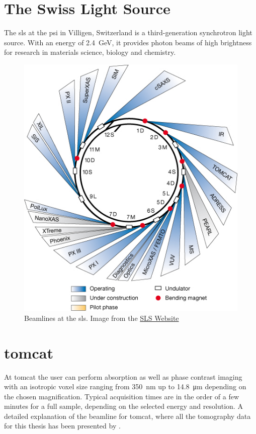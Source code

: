 \section{The Swiss Light Source}
The \ac{sls} at the \ac{psi} in Villigen, Switzerland is a third-generation synchrotron light source. With an energy of \SI{2.4}{\giga\electronvolt}, it provides photon beams of high brightness for research in materials science, biology and chemistry.

\renewcommand{\imsize}{0.618\linewidth}%
\begin{figure}[htb]
	\centering
	\includegraphics[width=\imsize]{img/SLS_beamlines_2008}
	\caption[Beamlines at the Swiss Light Source]{Beamlines at the \ac{sls}. Image from the \href{http://sls.web.psi.ch/view.php/beamlines/}{SLS Website}}
	\label{fig:beamlines}
\end{figure}

\section{tomcat}\label{sec:tomcat}
At \acf{tomcat} the user can perform absorption as well as phase contrast imaging with an isotropic voxel size ranging from \SI{350}{\nano\meter} up to \SI{14.8}{\micro\meter} depending on the chosen magnification. Typical acquisition times are in the order of a few minutes for a full sample, depending on the selected energy and resolution. A detailed explanation of the beamline for \ac{tomcat}, where all the tomography data for this thesis has been presented by \citet{Stampanoni2006a}.

